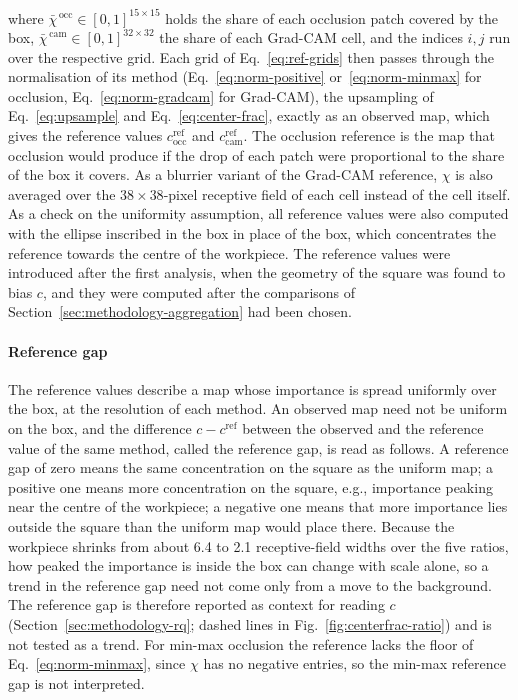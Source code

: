 where $\bar{\chi}^{\,\mathrm{occ}} \in [0,1]^{15 \times 15}$ holds the share of each
occlusion patch covered by the box, $\bar{\chi}^{\,\mathrm{cam}} \in
[0,1]^{32 \times 32}$ the share of each Grad-CAM cell, and the indices $i, j$ run over
the respective grid. Each grid of Eq.~\eqref{eq:ref-grids} then passes through the
normalisation of its method (Eq.~\eqref{eq:norm-positive} or~\eqref{eq:norm-minmax} for
occlusion, Eq.~\eqref{eq:norm-gradcam} for Grad-CAM), the upsampling of
Eq.~\eqref{eq:upsample} and Eq.~\eqref{eq:center-frac}, exactly as an observed map,
which gives the reference values $c^{\mathrm{ref}}_{\mathrm{occ}}$ and
$c^{\mathrm{ref}}_{\mathrm{cam}}$. The occlusion reference is the map that occlusion
would produce if the drop of each patch were proportional to the share of the box it
covers. As a blurrier variant of the Grad-CAM reference, $\chi$ is also averaged over
the $38 \times 38$-pixel receptive field of each cell instead of the cell itself. As a check on the uniformity assumption, all reference
values were also computed with the ellipse inscribed in the box in place of the box,
which concentrates the reference towards the centre of the workpiece. The reference
values were introduced after the first analysis, when the geometry of the square was
found to bias $c$, and they were computed after the comparisons of
Section~\ref{sec:methodology-aggregation} had been chosen.

\paragraph{Reference gap}
\label{sec:methodology-refgap}
The reference values describe a map whose importance is spread uniformly over the box,
at the resolution of each method. An observed map need not be uniform on the box, and
the difference $c - c^{\mathrm{ref}}$ between the observed and the reference value of
the same method, called the reference gap, is read as follows. A reference gap of zero
means the same concentration on the square as the uniform map; a positive one means
more concentration on the square, e.g., importance peaking near the centre of the
workpiece; a negative one means that more importance lies outside the square than the
uniform map would place there. Because the workpiece shrinks from about 6.4 to 2.1
receptive-field widths over the five ratios, how peaked the importance is inside the
box can change with scale alone, so a trend in the reference gap need not come only
from a move to the background. The reference gap is therefore reported as context for
reading $c$ (Section~\ref{sec:methodology-rq}; dashed lines in
Fig.~\ref{fig:centerfrac-ratio}) and is not tested as a trend. For min-max
occlusion the reference lacks the floor of Eq.~\eqref{eq:norm-minmax}, since $\chi$ has
no negative entries, so the min-max reference gap is not interpreted.

